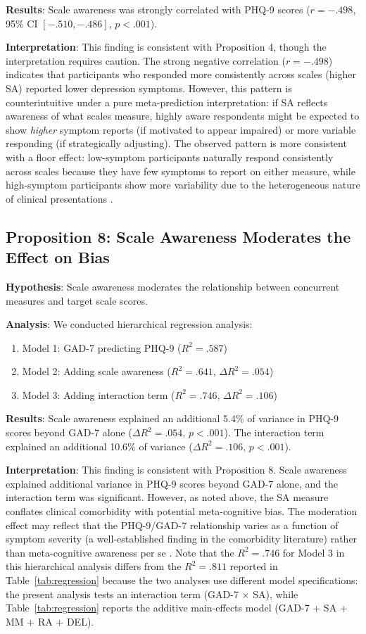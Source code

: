 \documentclass[10pt,twocolumn]{article}
\begin{document}
\textbf{Results}: Scale awareness was strongly correlated with PHQ-9 scores ($r = -.498$, 95\% CI $[-.510, -.486]$, $p < .001$).

\textbf{Interpretation}: This finding is consistent with Proposition 4, though the interpretation requires caution. The strong negative correlation ($r = -.498$) indicates that participants who responded more consistently across scales (higher SA) reported lower depression symptoms. However, this pattern is counterintuitive under a pure meta-prediction interpretation: if SA reflects awareness of what scales measure, highly aware respondents might be expected to show \textit{higher} symptom reports (if motivated to appear impaired) or more variable responding (if strategically adjusting). The observed pattern is more consistent with a floor effect: low-symptom participants naturally respond consistently across scales because they have few symptoms to report on either measure, while high-symptom participants show more variability due to the heterogeneous nature of clinical presentations \citep{Clark1991}.

\subsection{Proposition 8: Scale Awareness Moderates the Effect on Bias}

\textbf{Hypothesis}: Scale awareness moderates the relationship between concurrent measures and target scale scores.

\textbf{Analysis}: We conducted hierarchical regression analysis:
\begin{enumerate}
    \item Model 1: GAD-7 predicting PHQ-9 ($R^2 = .587$)
    \item Model 2: Adding scale awareness ($R^2 = .641$, $\Delta R^2 = .054$)
    \item Model 3: Adding interaction term ($R^2 = .746$, $\Delta R^2 = .106$)
\end{enumerate}

\textbf{Results}: Scale awareness explained an additional 5.4\% of variance in PHQ-9 scores beyond GAD-7 alone ($\Delta R^2 = .054$, $p < .001$). The interaction term explained an additional 10.6\% of variance ($\Delta R^2 = .106$, $p < .001$).

\textbf{Interpretation}: This finding is consistent with Proposition 8. Scale awareness explained additional variance in PHQ-9 scores beyond GAD-7 alone, and the interaction term was significant. However, as noted above, the SA measure conflates clinical comorbidity with potential meta-cognitive bias. The moderation effect may reflect that the PHQ-9/GAD-7 relationship varies as a function of symptom severity (a well-established finding in the comorbidity literature) rather than meta-cognitive awareness per se \citep{Mineka1998}. Note that the $R^2 = .746$ for Model 3 in this hierarchical analysis differs from the $R^2 = .811$ reported in Table~\ref{tab:regression} because the two analyses use different model specifications: the present analysis tests an interaction term (GAD-7 $\times$ SA), while Table~\ref{tab:regression} reports the additive main-effects model (GAD-7 + SA + MM + RA + DEL).
\end{document}
